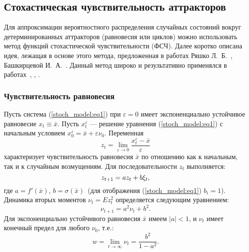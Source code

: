 \documentclass[a4paper, 14pt]{extreport}
\newcommand\abs[1]{\left|#1\right|}
\numberwithin{equation}{section}
\numberwithin{figure}{section}
\numberwithin{table}{section}
\begin{document}
		\subsection{Стохастическая чувствительность аттракторов}
		\label{stoch_attr}
			Для аппроксимации вероятностного распределения случайных состояний вокруг детерминированных аттракторов (равновесия или циклов) можно использовать метод функций стохастической чувствительности (ФСЧ). Далее коротко описана идея, лежащая в основе этого метода, предложенная в работах Ряшко Л.~Б.~\cite{Ryashko2013}, Башкирцевой И.~А.~\cite{Bashkirtseva2015}. Данный метод широко и результативно применялся в работах~\cite{Bashkirtseva2018}, \cite{Bashkirtseva2017}, \cite{Bashkirtseva2014}.
			\subsubsection{Чувствительность равновесия}
			\label{stoch_eq_sensivity}
				Пусть система (\ref{stoch_model:eq1}) при $ \varepsilon = 0 $ имеет экспоненциально устойчивое равновесие $ x_{t} \equiv \bar{x} $. Пусть $ x^{\varepsilon}_{t} $ --- решение уравнения (\ref{stoch_model:eq1}) с начальным условием $ x^{\varepsilon}_{0} = \bar{x} + \varepsilon \nu_{0} $. Переменная
				\begin{equation}
					z_{t} = \lim_{\varepsilon \to 0} \frac{x^{\varepsilon}_{t} - \bar{x}}{\varepsilon}
				\end{equation}
				характеризует чувствительность равновесия $ \bar{x} $ по отношению как к начальным, так и к случайным возмущениям. Для последовательности $ z_{t} $ выполняется:
				\begin{equation}
					z_{t + 1} = a z_{t} + b \xi_{t}, \\[1mm]
				\end{equation}
				где $ a = f'(\bar{x}) $, $ b = \sigma(\bar{x}) $~(для отображения (\ref{stoch_model:eq1}) $ b_{i} = 1 $). Динамика вторых моментов $ \nu_{t} = Ez^{2}_{t} $ определяется следующим уравнением: %
				\begin{equation}
					\nu_{t + 1} = a^{2} \nu_{t} + b^{2}.
				\end{equation}
				Для экспоненциально устойчивого равновесия $ \bar{x} $ имеем $ \abs{a} < 1 $, и $ \nu_{t} $ имеет конечный предел для любого $ \nu_{0} $, т.е.:
				\begin{equation}
					w = \lim_{t \to \infty} \nu_{t} = \frac{b^{2}}{1 - a^2}.
				\end{equation} %
\end{document}
